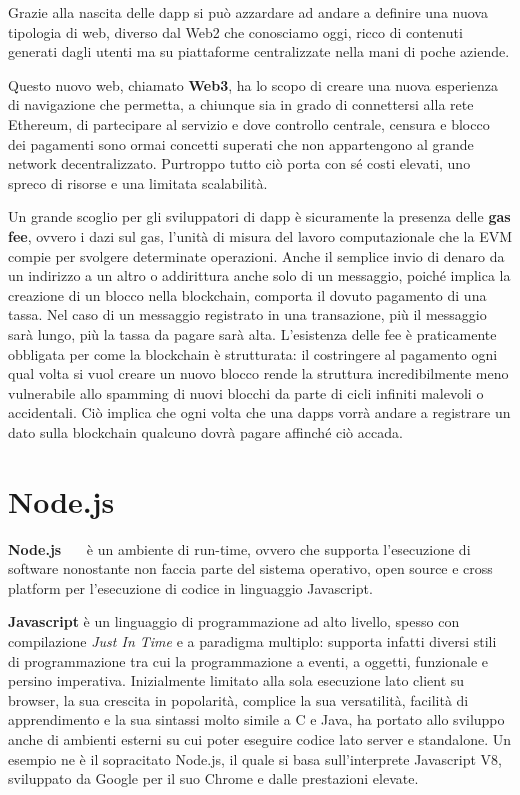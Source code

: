 Grazie alla nascita delle dapp si può azzardare ad andare a definire una nuova
tipologia di web, diverso dal Web2 che conosciamo oggi, ricco di contenuti generati
dagli utenti ma su piattaforme centralizzate nella mani di poche aziende.

Questo nuovo web, chiamato \textbf{Web3}, ha lo scopo di creare una nuova
esperienza di navigazione che permetta, a chiunque sia in grado di connettersi
alla rete Ethereum, di partecipare al servizio e dove controllo centrale,
censura e blocco dei pagamenti sono ormai concetti superati che non appartengono
al grande network decentralizzato. Purtroppo tutto ciò porta con sé costi elevati,
uno spreco di risorse e una limitata scalabilità.

Un grande scoglio per gli sviluppatori di dapp è sicuramente la presenza
delle \textbf{gas fee}, ovvero i dazi sul \textsf{gas}, l'unità di misura del
lavoro computazionale che la EVM compie per svolgere determinate operazioni.
Anche il semplice invio di denaro da un indirizzo a un altro o addirittura anche
solo di un messaggio, poiché implica la creazione di un blocco nella blockchain,
comporta il dovuto pagamento di una tassa. Nel caso di un messaggio registrato in
una transazione, più il messaggio sarà lungo, più la tassa da pagare sarà alta.
L'esistenza delle fee è praticamente obbligata per come la blockchain è strutturata:
il costringere al pagamento ogni qual volta si vuol creare un nuovo blocco rende
la struttura incredibilmente meno vulnerabile allo spamming di nuovi blocchi da
parte di cicli infiniti malevoli o accidentali.
Ciò implica che ogni volta che una dapps vorrà andare a registrare un dato sulla
blockchain qualcuno dovrà pagare affinché ciò accada. 

\section{Node.js}

\textbf{Node.js}~\cite{njs-1}~\cite{njs-2}~\cite{njs-3} è un ambiente di run-time, ovvero che supporta l'esecuzione di
software nonostante non faccia parte del sistema operativo, open source e cross
platform per l'esecuzione di codice in linguaggio Javascript.

\textbf{Javascript} è un linguaggio di programmazione ad alto livello,
spesso con compilazione \emph{Just In Time} e a paradigma multiplo: supporta infatti diversi
stili di programmazione tra cui la programmazione a eventi, a oggetti,
funzionale e persino imperativa.
Inizialmente limitato alla sola esecuzione lato client su browser,
la sua crescita in popolarità, complice la sua versatilità, facilità
di apprendimento e la sua sintassi molto simile a C e Java, ha portato
allo sviluppo anche di ambienti esterni su cui poter eseguire codice lato server
e standalone. Un esempio ne è il sopracitato Node.js, il quale si basa sull'interprete
Javascript V8, sviluppato da Google per il suo Chrome e dalle prestazioni elevate.


